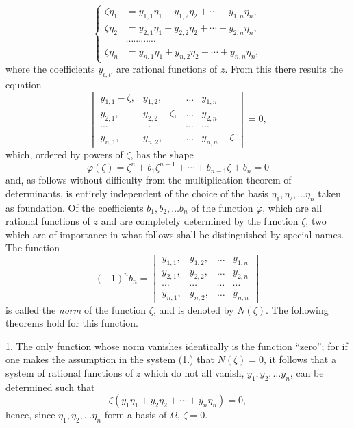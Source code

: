 \documentclass{article}
\begin{document}
\[ \left\{ \begin{aligned} \zeta\eta_{1} &= y_{1,1}\eta_{1} + y_{1,2}\eta_{2} + \cdots + y_{1,n}\eta_{n}, \\ \zeta\eta_{2} &= y_{2,1}\eta_{1} + y_{2,2}\eta_{2} + \cdots + y_{2,n}\eta_{n}, \\ &\cdots\cdots\cdots\cdots \\ \zeta\eta_{n} &= y_{n,1}\eta_{1} + y_{n,2}\eta_{2} + \cdots + y_{n,n}\eta_{n}, \end{aligned} \right. \tag{1.} \]
where the coefficients $y_{\iota,\iota'}$ are rational functions of $z$. From this there results the equation
\[ \begin{vmatrix} y_{1,1}-\zeta, & y_{1,2}, & \ldots & y_{1,n} \\ y_{2,1}, & y_{2,2}-\zeta, & \ldots & y_{2,n} \\ \cdots & \cdots & \cdots & \cdots \\ y_{n,1}, & y_{n,2}, & \ldots & y_{n,n}-\zeta \end{vmatrix} = 0, \tag{2.} \]
which, ordered by powers of $\zeta$, has the shape
\[ \varphi(\zeta) = \zeta^{n} + b_{1}\zeta^{n-1} + \cdots + b_{n-1}\zeta + b_{n} = 0 \tag{3.} \]
and, as follows without difficulty from the multiplication theorem of determinants, is entirely independent of the choice of the basis $\eta_{1}, \eta_{2}, \ldots \eta_{n}$ taken as foundation. Of the coefficients $b_{1}, b_{2}, \ldots b_{n}$ of the function $\varphi$, which are all rational functions of $z$ and are completely determined by the function $\zeta$, two which are of importance in what follows shall be distinguished by special names. The function
\[ (-1)^{n}b_{n} = \begin{vmatrix} y_{1,1}, & y_{1,2}, & \ldots & y_{1,n} \\ y_{2,1}, & y_{2,2}, & \ldots & y_{2,n} \\ \cdots & \cdots & \cdots & \cdots \\ y_{n,1}, & y_{n,2}, & \ldots & y_{n,n} \end{vmatrix} \tag{4.} \]
is called the \emph{norm} of the function $\zeta$, and is denoted by $N(\zeta)$. The following theorems hold for this function.

1. The only function whose norm vanishes identically is the function ``zero''; for if one makes the assumption in the system (1.) that $N(\zeta) = 0$, it follows that a system of rational functions of $z$ which do not all vanish, $y_{1}, y_{2}, \ldots y_{n}$, can be determined such that
\[ \zeta(y_{1}\eta_{1} + y_{2}\eta_{2} + \cdots + y_{n}\eta_{n}) = 0, \]
hence, since $\eta_{1}, \eta_{2}, \ldots \eta_{n}$ form a basis of $\Omega$, $\zeta = 0$.
\end{document}
